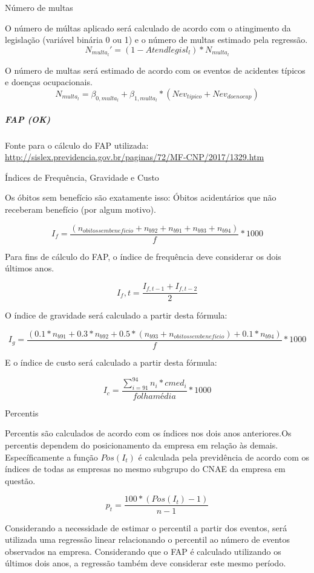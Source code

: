 \documentclass[]{article}
\let\oldsubparagraph\subparagraph
\renewcommand{\subparagraph}[1]{\oldsubparagraph{#1}\mbox{}}
\begin{document}
Número de multas

O número de múltas aplicado será calculado de acordo com o atingimento
da legislação (variável binária 0 ou 1) e o número de multas estimado
pela regressão. \[N_{multa_l}' = (1 - Atendlegisl_l) * N_{multa_l}\]

O número de multas será estimado de acordo com os eventos de acidentes
típicos e doenças ocupacionais.
\[ N_{multa_l} =  \beta_{0,multa_l} + \beta_{1,multa_l} * (Nev_{tipico} + Nev_{doenocup})\]

\subparagraph{FAP (OK)}\label{fap-ok}

Fonte para o cálculo do FAP utilizada:
\url{http://sislex.previdencia.gov.br/paginas/72/MF-CNP/2017/1329.htm}

Índices de Frequência, Gravidade e Custo

Os óbitos sem benefício são exatamente isso: Óbitos acidentários que não
receberam benefício (por algum motivo).

\[I_f = \frac{(n_{obitossembeneficio}+n_{b92}+n_{b91}+n_{b93}+n_{b94})}{f} * 1000\]

Para fins de cálculo do FAP, o índice de frequência deve considerar os
dois últimos anos.

\[I_f,t = \frac{I_{f,t-1} + I_{f,t-2}}{2}\]

O índice de gravidade será calculado a partir desta fórmula:

\[I_g = \frac{(0.1*n_{b91}+0.3*n_{b92}+0.5*(n_{b93}+n_{obitossembeneficio})+0.1*n_{b94})}{f}* 1000\]

E o índice de custo será calculado a partir desta fórmula:

\[I_c = \frac{\sum_{i=91}^{94} n_{i}*cmed_{i}}{folhamédia} * 1000\]

Percentis

Percentis são calculados de acordo com os índices nos dois anos
anteriores.Os percentis dependem do posicionamento da empresa em relação
às demais. Específicamente a função \(Pos(I_{t})\) é calculada pela
previdência de acordo com os índices de todas as empresas no mesmo
subgrupo do CNAE da empresa em questão.

\[p_t = \frac{100*(Pos(I_{t})-1)}{n-1}\]

Considerando a necessidade de estimar o percentil a partir dos eventos,
será utilizada uma regressão linear relacionando o percentil ao número
de eventos observados na empresa. Considerando que o FAP é calculado
utilizando os últimos dois anos, a regressão também deve considerar este
mesmo período.
\end{document}
